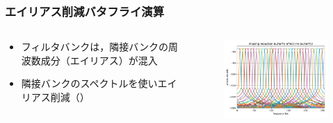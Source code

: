 \documentclass[14pt,xcolor=dvipsnames,table,dvipdfmx]{beamer}
\begin{document}
\begin{frame}[c]
    \frametitle{エイリアス削減バタフライ演算}
    \begin{columns}
        \begin{column}{0.35\textwidth}
            \begin{itemize}
                \item フィルタバンクは，隣接バンクの周波数成分（エイリアス）が混入
                \item 隣接バンクのスペクトルを使いエイリアス削減（\cite{edler1992aliasing}）
            \end{itemize}
        \end{column}
        \begin{column}{0.7\textwidth}
            \begin{figure}
                \includegraphics[width=85mm]{./figs/MP3_aliasing_reduction_butterfly_no_butterfly.pdf}
            \end{figure}
        \end{column}
    \end{columns}
\end{frame}
\end{document}
